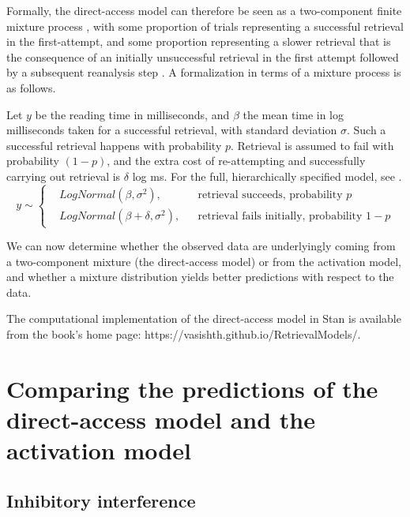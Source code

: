 \documentclass{cambridge7A}\usepackage[]{graphicx}\usepackage[]{color}
\begin{document}
Formally, the direct-access model can therefore be seen as a two-component finite mixture process \citep{mclachlan2004finite,fruhwirth2006finite}, with some proportion of trials representing a successful retrieval in the first-attempt, and some proportion representing a slower retrieval that is the consequence of an initially unsuccessful retrieval in the first attempt followed by a subsequent reanalysis step \citep{NicenboimRetrieval2018}. A formalization in terms of a mixture process is as follows.

Let $y$ be the reading time in milliseconds, and $\beta$ the mean time in log milliseconds taken for a successful retrieval, with standard deviation $\sigma$. Such a successful retrieval happens with probability $p$. Retrieval is assumed to fail with probability $(1-p)$, and the extra cost of re-attempting and successfully carrying out retrieval is $\delta$ log ms. For the full, hierarchically specified model, see \citep{NicenboimRetrieval2018}.
\begin{equation} \label{eq:mixmodsr2}
  y \sim \left \{
  \begin{aligned}
    &LogNormal(\beta,\sigma^2), && \text{retrieval succeeds, probability $p$} \\
    & LogNormal(\beta+\delta,\sigma^2), && \text{retrieval fails initially, probability $1-p$} 
  \end{aligned} \right.
\end{equation} 

We can now determine whether the observed data are underlyingly coming from a two-component mixture (the direct-access model) or from the activation model, and whether a mixture distribution yields better predictions with respect to the data.  

The \cite{NicenboimRetrieval2018} computational implementation of the direct-access model in Stan \citep{stan:2017} is available from the book's home page: https://vasishth.github.io/RetrievalModels/.

\section{Comparing the predictions of the direct-access model and the activation model}\label{nicenboiminhint}

\subsection{Inhibitory interference}
\end{document}

